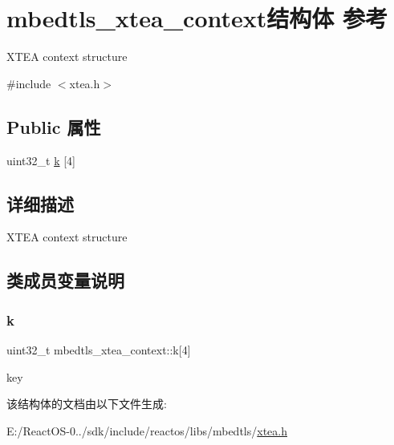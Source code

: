 \hypertarget{structmbedtls__xtea__context}{}\section{mbedtls\+\_\+xtea\+\_\+context结构体 参考}
\label{structmbedtls__xtea__context}


X\+T\+EA context structure  




{\ttfamily \#include $<$xtea.\+h$>$}

\subsection*{Public 属性}
\begin{DoxyCompactItemize}
\item 
uint32\+\_\+t \hyperlink{structmbedtls__xtea__context_a3deb125da7fe64c36a22030bf19af98f}{k} \mbox{[}4\mbox{]}
\end{DoxyCompactItemize}


\subsection{详细描述}
X\+T\+EA context structure 

\subsection{类成员变量说明}
\mbox{\label{structmbedtls__xtea__context_a3deb125da7fe64c36a22030bf19af98f}} 
\subsubsection{\texorpdfstring{k}{k}}
{\footnotesize\ttfamily uint32\+\_\+t mbedtls\+\_\+xtea\+\_\+context\+::k\mbox{[}4\mbox{]}}

key 

该结构体的文档由以下文件生成\+:\begin{DoxyCompactItemize}
\item 
E\+:/\+React\+O\+S-\/0../sdk/include/reactos/libs/mbedtls/\hyperlink{xtea_8h}{xtea.\+h}\end{DoxyCompactItemize}
